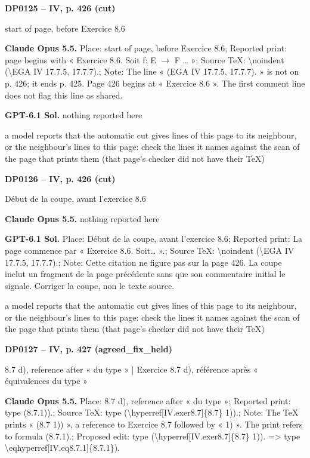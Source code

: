 \par\noindent\hypertarget{DP0125}{}\textbf{DP0125 -- IV, p. 426 (cut)}\par
start of page, before Exercice 8.6\par
\textbf{Claude Opus 5.5.} Place: start of page, before Exercice 8.6; Reported print: page begins with « Exercice 8.6. Soit f: E \ensuremath{\to} F … »; Source TeX: \textbackslash{}noindent (\textbackslash{}EGA IV 17.7.5, 17.7.7).; Note: The line « (EGA IV 17.7.5, 17.7.7). » is not on p. 426; it ends p. 425. Page 426 begins at « Exercice 8.6 ». The first comment line does not flag this line as shared.\par
\textbf{GPT-6.1 Sol.} nothing reported here\par
a model reports that the automatic cut gives lines of this page to its neighbour, or the neighbour's lines to this page: check the lines it names against the scan of the page that prints them (that page's checker did not have their TeX)\par
\par\noindent\hypertarget{DP0126}{}\textbf{DP0126 -- IV, p. 426 (cut)}\par
Début de la coupe, avant l'exercice 8.6\par
\textbf{Claude Opus 5.5.} nothing reported here\par
\textbf{GPT-6.1 Sol.} Place: Début de la coupe, avant l'exercice 8.6; Reported print: La page commence par « Exercice 8.6. Soit… ».; Source TeX: \textbackslash{}noindent (\textbackslash{}EGA IV 17.7.5, 17.7.7).; Note: Cette citation ne figure pas sur la page 426. La coupe inclut un fragment de la page précédente sans que son commentaire initial le signale. Corriger la coupe, non le texte source.\par
a model reports that the automatic cut gives lines of this page to its neighbour, or the neighbour's lines to this page: check the lines it names against the scan of the page that prints them (that page's checker did not have their TeX)\par
\par\noindent\hypertarget{DP0127}{}\textbf{DP0127 -- IV, p. 427 (agreed\_fix\_held)}\par
8.7 d), reference after « du type » | Exercice 8.7 d), référence après « équivalences du type »\par
\textbf{Claude Opus 5.5.} Place: 8.7 d), reference after « du type »; Reported print: type (8.7.1)).; Source TeX: type (\textbackslash{}hyperref[IV.exer8.7]\{8.7\} 1)).; Note: The TeX prints « (8.7 1)) », a reference to Exercice 8.7 followed by « 1) ». The print refers to formula (8.7.1).; Proposed edit: type (\textbackslash{}hyperref[IV.exer8.7]\{8.7\} 1)). =\allowbreak > type \textbackslash{}eqhyperref[IV.eq8.7.1]\{8.7.1\}).\par
